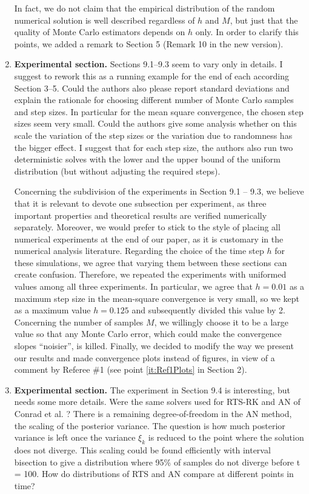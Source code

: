\documentclass[10pt]{article}
\begin{document}
\begin{enumerate}
\begin{enumerate}[label=\alph*.]
	\end{enumerate}
	In fact, we do not claim that the empirical distribution of the random numerical solution is well described regardless of $h$ and $M$, but just that the quality of Monte Carlo estimators depends on $h$ only. In order to clarify this points, we added a remark to Section 5 (Remark 10 in the new version).
	\item
	\begin{itquote} 
		\textbf{Experimental section.} Sections 9.1--9.3 seem to vary only in details. I suggest to rework this as a running example for the end of each according Section 3--5. Could the authors also please report standard deviations and explain the rationale for choosing different number of Monte Carlo samples and step sizes. In particular for the mean square convergence, the chosen step sizes seem very small. Could the authors give some analysis whether on this scale the variation of the step sizes or the variation due to randomness has the bigger effect. I suggest that for each	step size, the authors also run two deterministic solves with the lower and the	upper bound of the uniform distribution (but without adjusting the required steps).
	\end{itquote}
	Concerning the subdivision of the experiments in Section 9.1 -- 9.3, we believe that it is relevant to devote one subsection per experiment, as three important properties and theoretical results are verified numerically separately. Moreover, we would prefer to stick to the style of placing all numerical experiments at the end of our paper, as it is customary in the numerical analysis literature. Regarding the choice of the time step $h$ for these simulations, we agree that varying them between these sections can create confusion. Therefore, we repeated the experiments with uniformed values among all three experiments. In particular, we agree that $h = 0.01$ as a maximum step size in the mean-square convergence is very small, so we kept as a maximum value $h = 0.125$ and subsequently divided this value by 2. Concerning the number of samples $M$, we willingly choose it to be a large value so that any Monte Carlo error, which could make the convergence slopes ``noisier'', is killed. Finally, we decided to modify the way we present our results and made convergence plots instead of figures, in view of a comment by Referee \#1 (see point \ref{it:Ref1Plots} in Section 2).
	\item
	\begin{itquote}
		\textbf{Experimental section.} The experiment in Section 9.4 is interesting, but needs some more details. Were the same solvers used for RTS-RK and AN of Conrad et al. \cite{CGS17}? There is a remaining degree-of-freedom in the AN method, the scaling of the posterior variance. The question is how much posterior variance is left once the variance $\xi_k$ is reduced to the point where the solution does not diverge. This scaling could be found efficiently with interval bisection to give a distribution where 95\% of samples do not diverge before t = 100. How do distributions of RTS and AN compare at different points in time?

\end{itquote}
\end{enumerate}
\end{document}
